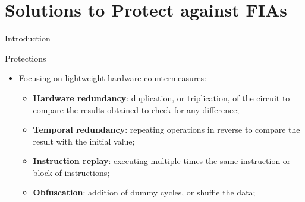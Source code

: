 \section{Solutions to Protect against FIAs}

\begin{frame}{Introduction}
    \begin{block}{Protections}
        \begin{itemize}
            \item Focusing on lightweight hardware countermeasures:
            \begin{itemize}
                \item \textbf{Hardware redundancy}: duplication, or triplication, of the circuit to compare the results obtained to check for any difference;
                \item \textbf{Temporal redundancy}: repeating operations in reverse to compare the result with the initial value;
                \item \textbf{Instruction replay}: executing multiple times the same instruction or block of instructions;
                \item \textbf{Obfuscation}: addition of dummy cycles, or shuffle the data;
            \end{itemize}
        \end{itemize}
    \end{block}

\end{frame}
